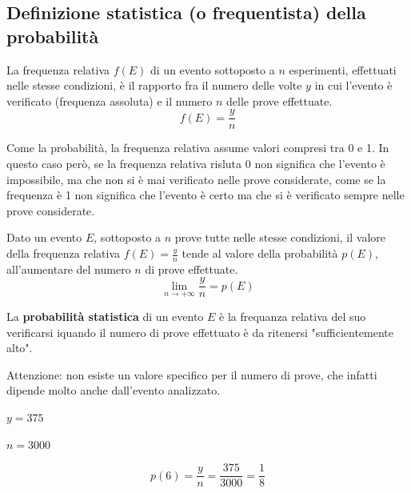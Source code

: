\documentclass{article}     %
\begin{document}
                \subsection{Definizione statistica (o frequentista) della probabilità}
                    \begin{boxdef}
                        La frequenza relativa $f(E)$ di un evento sottoposto a $n$ esperimenti, effettuati nelle stesse condizioni, è il rapporto fra il numero delle volte $y$ in cui l'evento è verificato (frequenza assoluta) e il numero $n$ delle prove effettuate.
                        \[f(E)=\frac{y}{n}\]
                    \end{boxdef}
                    Come la probabilità, la frequenza relativa assume valori compresi tra 0 e 1. In questo caso però, se la frequenza relativa risluta 0 non significa che l'evento è impossibile, ma che non si è mai verificato nelle prove considerate, come se la frequenza è 1 non significa che l'evento è certo ma che si è verificato sempre nelle prove considerate. 
                    \begin{shaded}
                    \begin{law}
                        Dato un evento $E$, sottoposto a $n$ prove tutte nelle stesse condizioni, il valore della frequenza relativa $f(E)=\frac{y}{n}$ tende al valore della probabilità $p(E)$, all'aumentare del numero $n$ di prove effettuate.
                        \[\lim_{n\rightarrow +\infty}\frac{y}{n}=p(E)\]
                    \end{law}
                    \end{shaded}
                    \begin{boxdef}
                        La \textbf{probabilità statistica} di un evento $E$ è la frequanza relativa del suo verificarsi iquando il numero di prove effettuato è da ritenersi "sufficientemente alto".
                    \end{boxdef}
                    Attenzione: non esiste un valore specifico per il numero di prove, che infatti dipende molto anche dall'evento analizzato. 
                    \begin{ex}
                        
                        $y=375$
                        
                        $n=3000$
                        
                        \[p(6)=\frac{y}{n}=\frac{375}{3000}=\frac{1}{8}\]
                    \end{ex}
\end{document}
